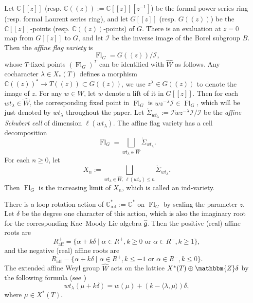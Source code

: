 \documentclass[12pt]{amsart}
\def\Fl{\operatorname{Fl}}
\def\aff{\operatorname{aff}}
\def\rot{\operatorname{rot}}
\begin{document}
Let $\mathbb{C}[[z]]$ (resp. $\mathbb{C}(\!(z)\!):=\mathbb{C}[[z]][z^{-1}]$) be the formal power series ring (resp. formal Laurent series ring), and let $G[[z]]$ (resp. $G(\!(z)\!)$)  be the $\mathbb{C}[[z]]$-points (resp. $\mathbb{C}(\!(z)\!)$-points) of $G$. There is an evaluation at $z=0$ map from $G[[z]]$ to $G$, and let $\mathcal{I}$ be the inverse image of the Borel subgroup $B$. Then the \emph{affine flag variety} is
$$\Fl_G = G(\!(z)\!)/\mathcal{I},$$
whose $T$-fixed points
$(\Fl_G)^T$ can be identified with  $\widehat{W}$ as follows. Any cocharacter $\lambda\in X_*(T)$ defines a morphism $\mathbb{C}(\!(z)\!)^*\rightarrow T(\!(z)\!)\subset G(\!(z)\!)$, we use $z^\lambda\in G(\!(z)\!)$ to denote the image of $z$. For any $w\in W$, let $\dot{w}$ denote a lift of it in $G[[z]]$. Then for each $wt_\lambda\in \widehat{W}$, the corresponding fixed point in $\Fl_G$ is $\dot{w}z^{-\lambda}\mathcal{I}\in \Fl_G$, which will be just denoted by $wt_\lambda$ throughout the paper. Let $\mathring{\Sigma}_{wt_\lambda}:=\mathcal{I}\dot{w}z^{-\lambda}\mathcal{I}/\mathcal{I}$ be the {\it affine Schubert cell} of dimension $\ell(wt_\lambda)$. The  affine flag variety has a cell decomposition 
\[\Fl_G=\bigsqcup_{wt_\lambda\in \widehat{W}}\mathring{\Sigma}_{wt_\lambda}.\]
For each $n\geq 0$, let 
\[
X_n:=\bigsqcup_{wt_\lambda\in \widehat{W},\,  \ell(wt_\lambda)\leq n}\mathring{\Sigma}_{wt_\lambda}.    
\]
 Then $\Fl_G$ is the increasing limit of $X_n$, which is called an ind-variety.

There is a loop rotation action of $\mathbb{C}^*_{\rot}:=\mathbb{C}^*$ on $\Fl_G$ by scaling the parameter $z$. Let $\delta$ be the degree one character of this action, which is also the imaginary root for the corresponding Kac--Moody Lie algebra $\hat{\mathfrak{g}}$. Then the positive (real)  affine roots are 
\begin{equation}\label{equ:affpos}
    R^+_{\aff}=\{\alpha+k\delta\mid \alpha\in R^+, k\geq 0 \text{ or } \alpha\in R^-, k\geq 1\},
\end{equation}
and the negative (real) affine roots are 
\[R^-_{\aff}=\{\alpha+k\delta\mid \alpha\in R^+, k\leq -1 \text{ or } \alpha\in R^-, k\leq 0\}.\]
The extended affine Weyl group $\widehat{W}$ acts on the lattice $X^*(T)\oplus\mathbbm{Z}\delta$ by the following formula (see \cite[(3.1)]{LS10})
\begin{equation}\label{equ:affact}
    wt_\lambda(\mu+k\delta)=w(\mu)+(k-\langle{\lambda, \mu\rangle})\delta,
\end{equation}
where $\mu\in X^*(T)$.
\end{document}
